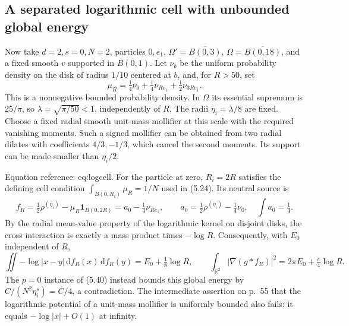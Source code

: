 \documentclass[10pt]{article}
\begin{document}
\subsection*{A separated logarithmic cell with unbounded global energy}
Now take \(d=2,s=0,N=2\), particles \(0,e_1\), \(\Omega'=\overline{B(0,3)}\), \(\Omega=\overline{B(0,18)}\), and a fixed smooth \(v\) supported in \(B(0,1)\). Let \(\nu_b\) be the uniform probability density on the disk of radius \(1/10\) centered at \(b\), and, for \(R>50\), set \[\mu_R=\tfrac14\nu_0+\tfrac14\nu_{Re_1}
                         +\tfrac12\nu_{3Re_1}.\] This is a nonnegative bounded probability density. In \(\Omega\) its essential supremum is \(25/\pi\), so \(\lambda=\sqrt{\pi/50}<1\), independently of \(R\). The radii \(\eta_i=\lambda/8\) are fixed. Choose a fixed radial smooth unit-mass mollifier at this scale with the required vanishing moments. Such a signed mollifier can be obtained from two radial dilates with coefficients \(4/3,-1/3\), which cancel the second moments. Its support can be made smaller than \(\eta_i/2\).\par
Equation reference: eq:logcell. For the particle at zero, \(R_i=2R\) satisfies the defining cell condition \(\int_{B(0,R_i)}\mu_R=1/N\) used in (5.24). Its neutral source is \[f_R=\tfrac12\rho^{(\eta_i)}
       -\mu_R\mathbf1_{B(0,2R)}
     =a_0-\tfrac14\nu_{Re_1},\qquad
 a_0=\tfrac12\rho^{(\eta_i)}-\tfrac14\nu_0,\quad \int a_0=\tfrac14 .\] By the radial mean-value property of the logarithmic kernel on disjoint disks, the cross interaction is exactly a mass product times \(-\log R\). Consequently, with \(E_0\) independent of \(R\), \[
 \iint-\log|x-y|\,\mathrm df_R(x)\,\mathrm df_R(y)=E_0+\tfrac18\log R,\qquad
 \int_{\mathbb R^2}|\nabla(g*f_R)|^2=2\pi E_0+\tfrac\pi4\log R .\] The \(p=0\) instance of (5.40) instead bounds this global energy by \(C/(N^2\eta_i^s)=C/4\), a contradiction. The intermediate assertion on p. 55 that the logarithmic potential of a unit-mass mollifier is uniformly bounded also fails: it equals \(-\log|x|+O(1)\) at infinity.\par
\end{document}
